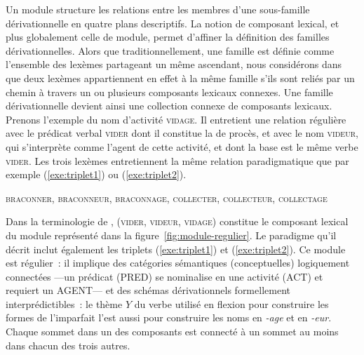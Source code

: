 \documentclass[output=paper]{langsci/langscibook}
\begin{document}
Un module structure les relations entre les membres d'une sous-famille dérivationnelle en quatre plans descriptifs. La notion de composant lexical, et plus globalement celle de module, permet d'affiner la définition des familles dérivationnelles.  Alors que traditionnellement, une famille est définie comme l'ensemble des lexèmes partageant un même ascendant, nous considérons  dans \paradis{} que deux lexèmes appartiennent en effet à la même famille s'ils sont reliés par un chemin à travers un ou plusieurs composants lexicaux connexes. Une famille dérivationnelle devient ainsi une collection connexe de composants lexicaux.
%
Prenons l'exemple du nom d'activité \textsc{vidage}. Il entretient une relation régulière avec le prédicat verbal \textsc{vider} dont il constitue la  de procès, et avec le nom \textsc{videur}, qui s'interprète comme l'agent de cette activité, et dont la base est le même verbe \textsc{vider}. Les trois lexèmes entretiennent la même relation paradigmatique que par exemple (\ref{exe:triplet1}) ou (\ref{exe:triplet2}).
%
\begin{exe}
  \ex\label{exe:triplet1} \textsc{braconner}, \textsc{braconneur}, \textsc{braconnage},
  \ex\label{exe:triplet2} \textsc{collecter}, \textsc{collecteur}, \textsc{collectage}
\end{exe}
%
Dans la terminologie de \paradis{}, (\textsc{vider}, \textsc{videur}, \textsc{vidage}) constitue le composant lexical du module représenté dans la figure~\ref{fig:module-regulier}.  Le paradigme qu'il décrit inclut également les triplets (\ref{exe:triplet1}) et (\ref{exe:triplet2}). Ce module est régulier~: il implique des catégories sémantiques (conceptuelles) logiquement connectées ---un prédicat ({PRED}) se nominalise en une activité ({ACT}) et requiert un  {AGENT}--- et des schémas dérivationnels formellement interprédictibles~:  le  thème
$Y$ du verbe utilisé en flexion pour construire les formes de l'imparfait l'est aussi  pour construire les noms en \emph{\mbox{-age}} et en \emph{\mbox{-eur}}.  Chaque sommet dans un des composants est connecté à un sommet au moins dans chacun des trois autres.
\end{document}
